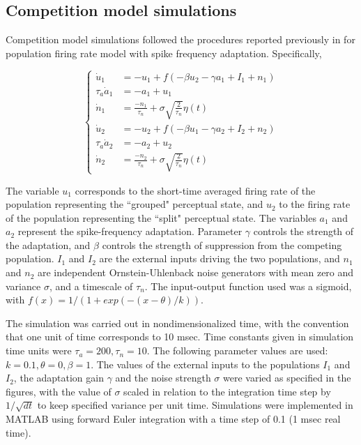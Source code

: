 \subsection*{Competition model simulations}
Competition model simulations followed the procedures reported previously in \cite{Shpiro2009} for population firing rate model with spike frequency adaptation. Specifically,

\begin{equation*}
	\begin{cases}
	\dot{u}_1 & = -u_1 +  f(-\beta u_2 - \gamma a_1 + I_1 + n_1) \\
	\tau_a \dot{a}_1 & = -a_1 + u_1\\
	\dot{n}_1 & = \frac{-n_1}{\tau_n} + \sigma \sqrt{\frac{2}{\tau_n}} \eta(t)\\
	\dot{u}_2 & = -u_2 +  f(-\beta u_1 - \gamma a_2 + I_2 + n_2) \\
	\tau_a \dot{a}_2 & = -a_2 + u_2\\
	\dot{n}_2 & = \frac{-n_2}{\tau_n } + \sigma \sqrt{\frac{2}{\tau_n}} \eta(t)
	
	\end{cases}
\end{equation*}

The variable $u_1$ corresponds to the short-time averaged firing rate of the population representing the ``grouped" perceptual state, and $u_2$ to the firing rate of the population representing the ``split" perceptual state. The variables $a_1$ and $a_2$ represent the spike-frequency adaptation. Parameter $\gamma$ controls the strength of the adaptation, and $\beta$ controls the strength of suppression from the competing population. $I_1$ and $I_2$ are the external inputs driving the two populations, and $n_1$ and $n_2$ are independent Ornstein-Uhlenback noise generators with mean zero and variance $\sigma$, and a timescale of $\tau_n$. 
The input-output function used was a sigmoid, with $f (x) = 1/(1 + exp(-(x - \theta )/ k))$. 

The simulation was carried out in nondimensionalized time, with the convention that one unit of time corresponds to 10 msec. Time constants given in simulation time units were $\tau_a = 200, \tau_n = 10$. The following parameter values are used: $k = 0.1, \theta = 0, \beta = 1$.  The values of the external inputs to the populations $I_1$ and $I_2$, the adaptation gain $\gamma$ and the noise strength $\sigma$ were varied as specified in the figures, with the value of $\sigma$ scaled in relation to the integration time step by $1/\sqrt{dt}$ to keep specified variance per unit time. Simulations were implemented in MATLAB using forward Euler integration with a time step of 0.1 (1 msec real time).


